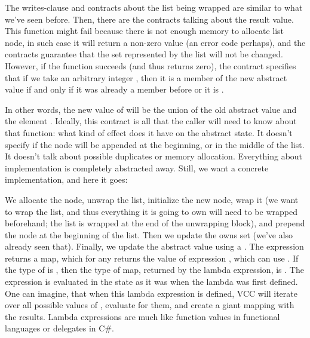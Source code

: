 
\noindent
The writes-clause and contracts about the list being wrapped are similar to what
we've seen before.
Then, there are the contracts talking about the result value.
This function might fail because there is not enough memory to allocate list node,
in such case it will return a non-zero value (an error code perhaps),
and the contracts guarantee that the set represented by the list will not be changed.
However, if the function succeeds (and thus returns zero), the contract specifies
that if we take an arbitrary integer , then it is a member of the new abstract
value if and only if it was already a member before or it is .

In other words, the new value of  will be the union of the old
abstract value and the element .
Ideally, this contract is all that the caller will need to know about that function:
what kind of effect does it have on the abstract state. 
It doesn't specify if the node will be appended at the beginning, or in the middle
of the list.
It doesn't talk about possible duplicates or memory allocation.
Everything about implementation is completely abstracted away.
Still, we want a concrete implementation, and here it goes:


\noindent
We allocate the node, unwrap the list, initialize the new node,
wrap it (we want to wrap the list, and thus everything it is going to own will
need to be wrapped beforehand; the list is wrapped at the end of the 
unwrapping block), and
prepend the node at the beginning of the list.
Then we update the owns set (we've also already seen that).
Finally, we update the abstract value using a .
The expression  returns a map, which for
any  returns the value of expression ,
which can use .
If the type of  is , then the type of map, returned by the
lambda expression, is .
The expression is evaluated in the state as it was
when the lambda was first defined.
One can imagine, that when this lambda expression is defined,
VCC will iterate over all possible values of ,
evaluate  for them, and create a giant mapping
with the results.
Lambda expressions are much like function values in functional
languages or delegates in C\#.


